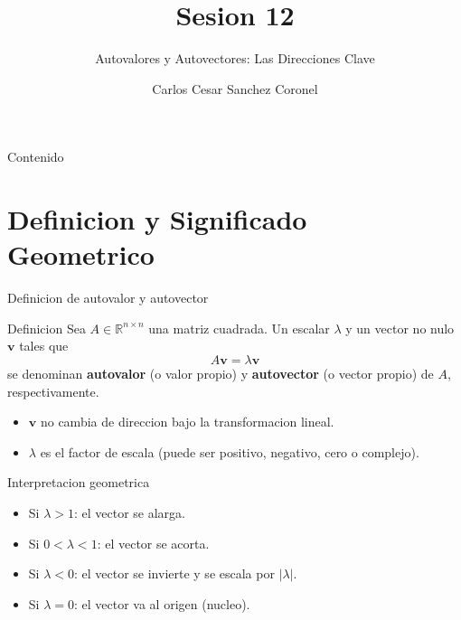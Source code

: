 \documentclass[aspectratio=169, 10pt, xcolor=table]{beamer}
\title[SESION 12 CALCULO]{\textbf{Sesion 12}}
\subtitle{Autovalores y Autovectores: Las Direcciones Clave}
\author[Prof. C. Sanchez]{Carlos Cesar Sanchez Coronel}
\institute{\textbf{CALCULO Y ALGEBRA LINEAL PARA IA}}
\date{}
\begin{document}
\begin{frame}
    \titlepage
\end{frame}

\begin{frame}{Contenido}
    \tableofcontents
\end{frame}

\section{Definicion y Significado Geometrico}

\begin{frame}{Definicion de autovalor y autovector}
    \begin{block}{Definicion}
        Sea $A\in\mathbb{R}^{n\times n}$ una matriz cuadrada. Un escalar $\lambda$ y un vector no nulo $\mathbf{v}$ tales que
        \[
        A\mathbf{v} = \lambda \mathbf{v}
        \]
        se denominan \textbf{autovalor} (o valor propio) y \textbf{autovector} (o vector propio) de $A$, respectivamente.
    \end{block}
    \begin{itemize}
        \item $\mathbf{v}$ no cambia de direccion bajo la transformacion lineal.
        \item $\lambda$ es el factor de escala (puede ser positivo, negativo, cero o complejo).
    \end{itemize}
\end{frame}

\begin{frame}{Interpretacion geometrica}
    \centering
    \begin{itemize}
        \item Si $\lambda>1$: el vector se alarga.
        \item Si $0<\lambda<1$: el vector se acorta.
        \item Si $\lambda<0$: el vector se invierte y se escala por $|\lambda|$.
        \item Si $\lambda=0$: el vector va al origen (nucleo).
    \end{itemize}
\end{frame}
\end{document}

